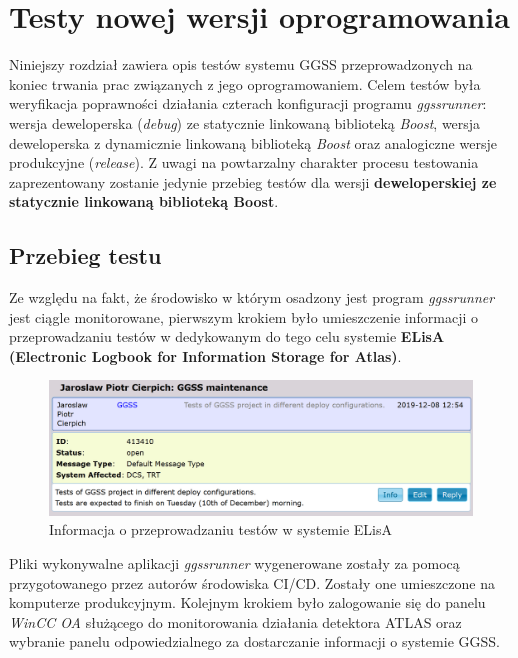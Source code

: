 \chapter{Testy nowej wersji oprogramowania}
\label{cha:test}
Niniejszy rozdział zawiera opis testów systemu GGSS przeprowadzonych na koniec trwania prac związanych z jego oprogramowaniem. Celem testów była weryfikacja poprawności działania czterach konfiguracji programu \textit{ggssrunner}: wersja deweloperska (\textit{debug}) ze statycznie linkowaną biblioteką \textit{Boost}, wersja deweloperska z dynamicznie linkowaną biblioteką \textit{Boost} oraz analogiczne wersje produkcyjne (\textit{release}). Z uwagi na powtarzalny charakter procesu testowania zaprezentowany zostanie jedynie przebieg testów dla wersji \textbf{deweloperskiej ze statycznie linkowaną biblioteką Boost}. 

\section{Przebieg testu}
Ze względu na fakt, że środowisko w którym osadzony jest program \textit{ggssrunner} jest ciągle monitorowane, pierwszym krokiem było umieszczenie informacji o przeprowadzaniu testów w dedykowanym do tego celu systemie \textbf{ELisA (Electronic Logbook for Information Storage for Atlas)}.

\begin{figure}[H]
\centering
\caption{Informacja o przeprowadzaniu testów w systemie ELisA}
\label{fig:elisa}
\includegraphics[width=\textwidth]{res/png/elisa}
\end{figure}

Pliki wykonywalne aplikacji \textit{ggssrunner} wygenerowane zostały za pomocą przygotowanego przez autorów środowiska CI/CD. Zostały one umieszczone na komputerze produkcyjnym. Kolejnym krokiem było zalogowanie się do panelu \textit{WinCC OA} służącego do monitorowania działania detektora ATLAS oraz wybranie panelu odpowiedzialnego za dostarczanie informacji o systemie GGSS. 

